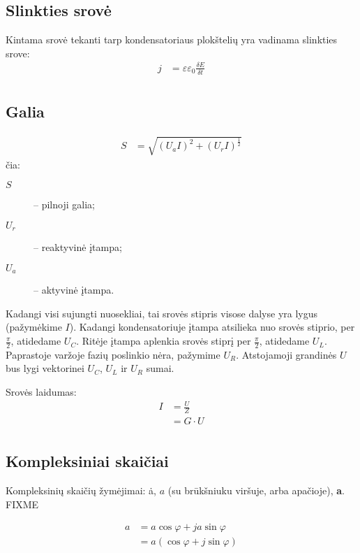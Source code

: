 \subsection{Slinkties srovė}

Kintama srovė tekanti tarp kondensatoriaus plokštelių yra vadinama
slinkties srove:
\begin{align*}
  j &= \varepsilon \varepsilon_{0} \frac{\delta E}{\delta t} \\
\end{align*}

\subsection{Galia}

\begin{align*}
  S
  &= \sqrt{\left( U_{a}I \right)^{2} +
    \left( U_{r}I \right)^{\frac{1}{2}}}
\end{align*}
čia:
\begin{description}
  \item[$S$] – pilnoji galia;
  \item[$U_{r}$] – reaktyvinė įtampa;
  \item[$U_{a}$] – aktyvinė įtampa.
\end{description}



Kadangi visi sujungti nuosekliai, tai srovės stipris visose dalyse
yra lygus (pažymėkime $I$). Kadangi kondensatoriuje įtampa atsilieka
nuo srovės stiprio, per $\frac{\pi}{2}$, atidedame $U_{C}$. Ritėje
įtampa aplenkia srovės stiprį per $\frac{\pi}{2}$, atidedame $U_{L}$.
Paprastoje varžoje fazių poslinkio nėra, pažymime $U_{R}$. Atstojamoji
grandinės $U$ bus lygi vektorinei $U_{C}$, $U_{L}$ ir $U_{R}$ sumai.

Srovės laidumas:
\begin{align*}
  I
  &= \frac{U}{Z} \\
  &= G \cdot U \\
\end{align*}

\subsection{Kompleksiniai skaičiai}

Kompleksinių skaičių žymėjimai:
\.{a}, $a$ (su brūkšniuku viršuje, arba apačioje), \textbf{a}. FIXME

\begin{align*}
  a
  &= a \cos \varphi + ja \sin \varphi \\
  &= a (\cos \varphi + j \sin \varphi) \\
\end{align*}

